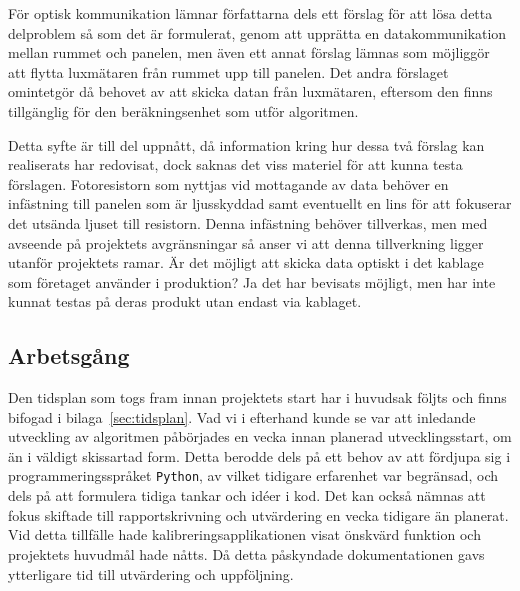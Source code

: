         För optisk kommunikation lämnar författarna dels ett förslag för att lösa detta delproblem så som det är formulerat, genom att upprätta en datakommunikation mellan rummet och panelen, men även ett annat förslag lämnas som möjliggör att flytta luxmätaren från rummet upp till panelen. Det andra förslaget omintetgör då behovet av att skicka datan från luxmätaren, eftersom den finns tillgänglig för den beräkningsenhet som utför algoritmen.\bigskip

        Detta syfte är till del uppnått, då information kring hur dessa två förslag kan realiserats har redovisat, dock saknas det viss materiel för att kunna testa förslagen. Fotoresistorn som nyttjas vid mottagande av data behöver en infästning till panelen som är ljusskyddad samt eventuellt en lins för att fokuserar det utsända ljuset till resistorn. Denna infästning behöver tillverkas, men med avseende på projektets avgränsningar så anser vi att denna tillverkning ligger utanför projektets ramar. Är det möjligt att skicka data optiskt i det kablage som företaget använder i produktion? Ja det har bevisats möjligt, men har inte kunnat testas på deras produkt utan endast via kablaget.

    \subsection{Arbetsgång} %
    \label{sub:arbetsg_ng}
        Den tidsplan som togs fram innan projektets start har i huvudsak följts och finns bifogad i bilaga~\ref{sec:tidsplan}. Vad vi i efterhand kunde se var att inledande utveckling av algoritmen påbörjades en vecka innan planerad utvecklingsstart, om än i väldigt skissartad form. Detta berodde dels på ett behov av att fördjupa sig i programmeringsspråket \texttt{Python}, av vilket tidigare erfarenhet var begränsad, och dels på att formulera tidiga tankar och idéer i kod. Det kan också nämnas att fokus skiftade till rapportskrivning och utvärdering en vecka tidigare än planerat. Vid detta tillfälle hade kalibreringsapplikationen visat önskvärd funktion och projektets huvudmål hade nåtts. Då detta påskyndade dokumentationen gavs ytterligare tid till utvärdering och uppföljning.\bigskip

